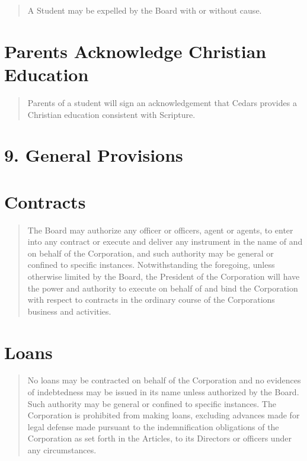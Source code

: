 \documentclass[
]{book}
\begin{document}
\begin{quote}
A Student may be expelled by the Board with or without cause.
\end{quote}

\section{Parents Acknowledge Christian Education}\label{parents-acknowledge-christian-education}

\begin{quote}
Parents of a student will sign an acknowledgement that Cedars provides
a Christian education consistent with Scripture.
\end{quote}

\section{9. General Provisions}\label{general-provisions}

\section{Contracts}\label{contracts}

\begin{quote}
The Board may authorize any officer or officers, agent or agents, to
enter into any contract or execute and deliver any instrument in the
name of and on behalf of the Corporation, and such authority may be
general or confined to specific instances. Notwithstanding the
foregoing, unless otherwise limited by the Board, the President of the
Corporation will have the power and authority to execute on behalf of
and bind the Corporation with respect to contracts in the ordinary
course of the Corporation\textquotesingle s business and activities.
\end{quote}

\section{Loans}\label{loans}

\begin{quote}
No loans may be contracted on behalf of the Corporation and no
evidences of indebtedness may be issued in its name unless authorized
by the Board. Such authority may be general or confined to specific
instances. The Corporation is prohibited from making loans, excluding
advances made for legal defense made pursuant to the indemnification
obligations of the Corporation as set forth in the Articles, to its
Directors or officers under any circumstances.
\end{quote}
\end{document}
